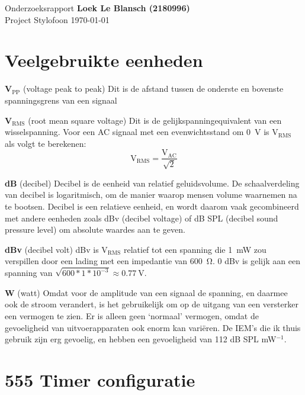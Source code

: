 \documentclass[12pt, a4paper, dutch]{article}
\newcommand{\sub}[1]{$_{\text{#1}}$}
\begin{document}
Onderzoeksrapport \hfill \textbf{Loek Le Blansch (2180996)}\\
Project Stylofoon \hfill \today
\medskip

\tableofcontents

\section{Veelgebruikte eenheden}


\textbf{V\sub{PP}} (voltage peak to peak)
Dit is de afstand tussen de onderste en bovenste spanningsgrens van een signaal

\textbf{V\sub{RMS}} (root mean square voltage)
Dit is de gelijkspanningequivalent van een wisselspanning. Voor een AC signaal
met een evenwichtsstand om \SI{0}{\volt} is V\sub{RMS} als volgt te berekenen:
\[ \text{V}_{\text{RMS}} = \frac{\text{V}_{\text{AC}}}{\sqrt{2}} \]

\textbf{dB} (decibel)
Decibel is de eenheid van relatief geluidsvolume. De schaalverdeling van decibel is
logaritmisch, om de manier waarop mensen volume waarnemen na te bootsen. Decibel is
een relatieve eenheid, en wordt daarom vaak gecombineerd met andere eenheden zoals
dBv (decibel voltage) of dB SPL (decibel sound pressure level) om absolute waardes
aan te geven.

\textbf{dBv} (decibel volt)
dBv is V\sub{RMS} relatief tot een spanning die \SI{1}{\milli\watt} zou verspillen
door een lading met een impedantie van \SI{600}{\ohm}. 0 dBv is gelijk aan een
spanning van $\sqrt{600 * 1 * 10^{-3}} \approx \SI{0.77}{\volt}$.

\textbf{W} (watt)
Omdat voor de amplitude van een signaal de spanning, en daarmee ook de stroom
verandert, is het gebruikelijk om op de uitgang van een versterker een vermogen te
zien. Er is alleen geen `normaal' vermogen, omdat de gevoeligheid van
uitvoerapparaten ook enorm kan vari\"eren. De IEM's die ik thuis gebruik zijn erg
gevoelig, en hebben een gevoeligheid van 112 dB SPL mW$^{-1}$.

\section{555 Timer configuratie}

\end{document}
